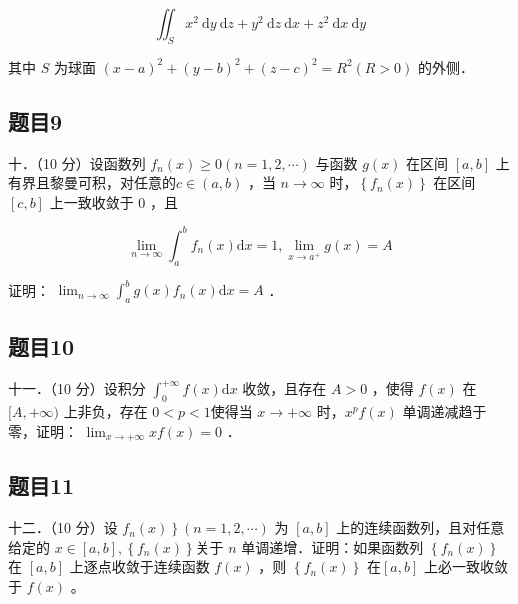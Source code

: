 \documentclass{article}
\begin{document}
\[
\iint_{S} x^{2} \mathrm{~d} y \mathrm{~d} z+y^{2} \mathrm{~d} z \mathrm{~d} x+z^{2} \mathrm{~d} x \mathrm{~d} y
\]

其中 \(S\) 为球面 \((x-a)^{2}+(y-b)^{2}+(z-c)^{2}=R^{2}(R>0)\) 的外侧．

\subsection{题目9}
十．（10 分）设函数列 \(f_{n}(x) \geq 0(n=1,2, \cdots)\) 与函数 \(g(x)\) 在区间 \([a, b]\) 上有界且黎曼可积，对任意的\(c \in(a, b)\) ，当 \(n \rightarrow \infty\) 时，\(\left\{f_{n}(x)\right\}\) 在区间 \([c, b]\) 上一致收敛于 0 ，且

\[
\lim _{n \rightarrow \infty} \int_{a}^{b} f_{n}(x) \mathrm{d} x=1, \lim _{x \rightarrow a^{+}} g(x)=A
\]

证明： \(\lim _{n \rightarrow \infty} \int_{a}^{b} g(x) f_{n}(x) \mathrm{d} x=A\) ．

\subsection{题目10}
十一．（10 分）设积分 \(\int_{0}^{+\infty} f(x) \mathrm{d} x\) 收敛，且存在 \(A>0\) ，使得 \(f(x)\) 在 \([A,+\infty)\) 上非负，存在 \(0<p<1\)使得当 \(x \rightarrow+\infty\) 时，\(x^{p} f(x)\) 单调递减趋于零，证明： \(\lim _{x \rightarrow+\infty} x f(x)=0\) ．

\subsection{题目11}
十二．（10 分）设 \(\left.f_{n}(x)\right\}(n=1,2, \cdots)\) 为 \([a, b]\) 上的连续函数列，且对任意给定的 \(x \in[a, b],\left\{f_{n}(x)\right\}\)关于 \(n\) 单调递增．证明：如果函数列 \(\left\{f_{n}(x)\right\}\) 在 \([a, b]\) 上逐点收敛于连续函数 \(f(x)\) ，则 \(\left\{f_{n}(x)\right\}\) 在\([a, b]\) 上必一致收敛于 \(f(x)\) 。
\end{document}
